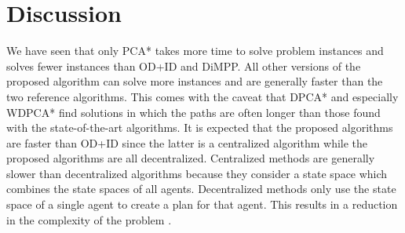 \section{Discussion}\label{sec:discussion}


We have seen that only PCA* takes more time to solve problem instances and
solves fewer instances than OD+ID and DiMPP. All other versions of the proposed
algorithm can solve more
instances and are generally faster than the two reference algorithms. This
comes with the caveat that DPCA* and especially WDPCA* find solutions in which
the paths are often longer than those found with the state-of-the-art
algorithms. It is expected that the proposed algorithms are faster than OD+ID
since the latter is a centralized algorithm while the proposed algorithms are
all decentralized. Centralized methods are generally slower than decentralized
algorithms because they consider a state space which combines the state spaces
of all agents. Decentralized methods only use the state space of a single agent
to create a plan for that agent. This results in a reduction in the complexity
of the problem \citep{bennewitz2002,sharon2013}.

